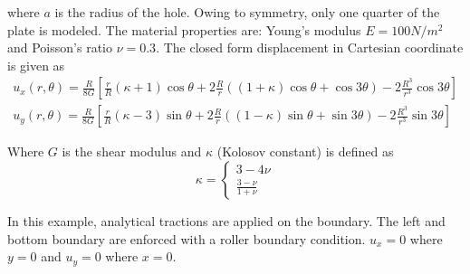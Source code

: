 where $a$ is the radius of the hole.
Owing to symmetry, only one quarter of the plate is modeled.
The material properties are: Young’s modulus $E = 100 N/m^2$ and Poisson’s ratio $\nu = 0.3$.
The closed form displacement in Cartesian coordinate is given as
    \begin{subequations}
        \begin{align}
            u_x(r,\theta) = \frac{R}{8G} \left[
                \frac{r}{R} (\kappa + 1) \cos\theta +
                2 \frac{R}{r} \left(
                    (1+ \kappa ) \cos\theta +
                    \cos3\theta
                \right) -
                2 \frac{R^3}{r^3}\cos3\theta
            \right] \\
            u_y(r,\theta) = \frac{R}{8G} \left[
                \frac{r}{R} (\kappa -3) \sin\theta +
                2 \frac{R}{r} \left(
                    (1 - \kappa) \sin\theta +
                    \sin3\theta
                \right) -
                2 \frac{R^3}{r^3}\sin3\theta
            \right]
        \end{align}
    \end{subequations}

Where $G$ is the shear modulus and $\kappa$ (Kolosov constant) is defined as
    \begin{equation}
        \kappa = \left\{
            \begin{aligned}   
                3-4 \nu \\
                \frac{3- \nu }{1+ \nu }    
            \end{aligned}
        \right.
    \label{iso_eq:kolosov_constant}
    \end{equation}

In this example, analytical tractions are applied on the boundary.
The left and bottom boundary are enforced with a roller boundary condition. $u_x=0$ where $y=0$
    and $u_y=0$ where $x=0$.

